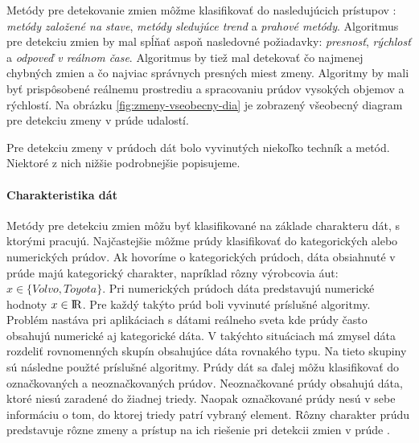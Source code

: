 Metódy pre detekovanie zmien môžme klasifikovať do nasledujúcich prístupov \citep{liu2010mining}: \textit{metódy založené na stave}, \textit{metódy sledujúce trend} a \textit{prahové metódy}. Algoritmus pre detekciu zmien by mal spĺňať aspoň nasledovné požiadavky: \textit{presnosť}, \textit{rýchlosť} a \textit{odpoveď v reálnom čase}. Algoritmus by tiež mal detekovať čo najmenej chybných zmien a čo najviac správnych presných miest zmeny. Algoritmy by mali byť prispôsobené reálnemu prostrediu a spracovaniu prúdov vysokých objemov a rýchlostí. Na obrázku \ref{fig:zmeny-vseobecny-dia} je zobrazený všeobecný diagram pre detekciu zmeny v prúde udalostí.

\label{fig:zmeny-vseobecny-dia}

Pre detekciu zmeny v prúdoch dát bolo vyvinutých niekoľko techník a metód. Niektoré z nich nižšie podrobnejšie popisujeme.

\paragraph{Charakteristika dát} Metódy pre detekciu zmien môžu byť klasifikované na základe charakteru dát, s ktorými pracujú. Najčastejšie môžme prúdy klasifikovať do kategorických alebo numerických prúdov. Ak hovoríme o kategorických prúdoch, dáta obsiahnuté v prúde majú kategorický charakter, napríklad rôzny výrobcovia áut: $x \in \{Volvo, Toyota\}$. Pri numerických prúdoch dáta predstavujú numerické hodnoty $x \in {\rm I\!R}$. Pre každý takýto prúd boli vyvinuté príslušné algoritmy. Problém nastáva pri aplikáciach s dátami reálneho sveta kde prúdy často obsahujú numerické aj kategorické dáta. V takýchto situáciach má zmysel dáta rozdeliť rovnomenných skupín obsahujúce dáta rovnakého typu. Na tieto skupiny sú následne použté príslušné algoritmy. Prúdy dát sa ďalej môžu klasifikovať do označkovaných a neoznačkovaných prúdov. Neoznačkované prúdy obsahujú dáta, ktoré niesú zaradené do žiadnej triedy. Naopak označkované prúdy nesú v sebe informáciu o tom, do ktorej triedy patrí vybraný element. Rôzny charakter prúdu predstavuje rôzne zmeny a prístup na ich riešenie pri detekcii zmien v prúde \citep{tran2014change}.

